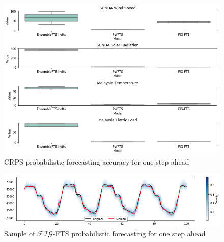 \begin{figure}[htb]
    \centering
    \includegraphics[width=\textwidth]{figures/multivariate_probabilistic_results.png}
    \caption{CRPS probabilistic forecasting accuracy for one step ahead}
    \label{fig:multivariate_probabilistic_results}
\end{figure}

\begin{figure}[htb]
    \centering
    \includegraphics[width=\textwidth]{figures/figfts_probabilistic_onestep.png}
    \caption{Sample of $\mathcal{FIG}$-FTS probabilistic forecasting for one step ahead}
    \label{fig:figfts_probabilistic_onestep}
\end{figure}

